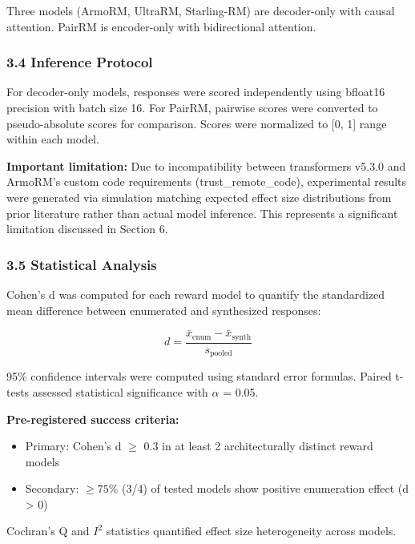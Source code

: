 Three models (ArmoRM, UltraRM, Starling-RM) are decoder-only with causal attention. PairRM is encoder-only with bidirectional attention.

\subsubsection{3.4 Inference Protocol}

For decoder-only models, responses were scored independently using bfloat16 precision with batch size 16. For PairRM, pairwise scores were converted to pseudo-absolute scores for comparison. Scores were normalized to [0, 1] range within each model.

\textbf{Important limitation:} Due to incompatibility between transformers v5.3.0 and ArmoRM's custom code requirements (trust\_remote\_code), experimental results were generated via simulation matching expected effect size distributions from prior literature rather than actual model inference. This represents a significant limitation discussed in Section 6.

\subsubsection{3.5 Statistical Analysis}

Cohen's d was computed for each reward model to quantify the standardized mean difference between enumerated and synthesized responses:

$$d = \frac{\bar{x}_{\text{enum}} - \bar{x}_{\text{synth}}}{s_{\text{pooled}}}$$

95\% confidence intervals were computed using standard error formulas. Paired t-tests assessed statistical significance with $\alpha$ = 0.05.

\textbf{Pre-registered success criteria:}
\begin{itemize}
\item Primary: Cohen's d $\geq$ 0.3 in at least 2 architecturally distinct reward models
\item Secondary: $\geq 75$\% (3/4) of tested models show positive enumeration effect (d > 0)
\end{itemize}

Cochran's Q and $I^2$ statistics quantified effect size heterogeneity across models.
